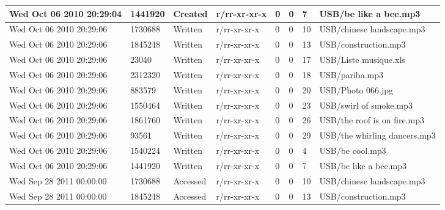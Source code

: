\begin{longtable}[c]{|p{0.121\DUtablewidth}|p{0.1\DUtablewidth}|p{0.08\DUtablewidth}|p{0.12\DUtablewidth}|p{0.06\DUtablewidth}|p{0.06\DUtablewidth}|p{0.06\DUtablewidth}|p{0.2\DUtablewidth}|}
Wed Oct 06 2010 20:29:04
 & 
1441920
 & 
Created
 & 
r/rr-xr-xr-x
 & 
0
 & 
0
 & 
7
 & 
USB/be like a bee.mp3
 \\
\hline

Wed Oct 06 2010 20:29:06
 & 
1730688
 & 
Written
 & 
r/rr-xr-xr-x
 & 
0
 & 
0
 & 
10
 & 
USB/chinese landscape.mp3
 \\
\hline

Wed Oct 06 2010 20:29:06
 & 
1845248
 & 
Written
 & 
r/rr-xr-xr-x
 & 
0
 & 
0
 & 
13
 & 
USB/construction.mp3
 \\
\hline

Wed Oct 06 2010 20:29:06
 & 
23040
 & 
Written
 & 
r/rr-xr-xr-x
 & 
0
 & 
0
 & 
17
 & 
USB/Liste musique.xls
 \\
\hline

Wed Oct 06 2010 20:29:06
 & 
2312320
 & 
Written
 & 
r/rr-xr-xr-x
 & 
0
 & 
0
 & 
18
 & 
USB/pariba.mp3
 \\
\hline

Wed Oct 06 2010 20:29:06
 & 
883579
 & 
Written
 & 
r/rr-xr-xr-x
 & 
0
 & 
0
 & 
20
 & 
USB/Photo 066.jpg
 \\
\hline

Wed Oct 06 2010 20:29:06
 & 
1550464
 & 
Written
 & 
r/rr-xr-xr-x
 & 
0
 & 
0
 & 
23
 & 
USB/swirl of smoke.mp3
 \\
\hline

Wed Oct 06 2010 20:29:06
 & 
1861760
 & 
Written
 & 
r/rr-xr-xr-x
 & 
0
 & 
0
 & 
26
 & 
USB/the roof is on fire.mp3
 \\
\hline

Wed Oct 06 2010 20:29:06
 & 
93561
 & 
Written
 & 
r/rr-xr-xr-x
 & 
0
 & 
0
 & 
29
 & 
USB/the whirling dancers.mp3
 \\
\hline

Wed Oct 06 2010 20:29:06
 & 
1540224
 & 
Written
 & 
r/rr-xr-xr-x
 & 
0
 & 
0
 & 
4
 & 
USB/be cool.mp3
 \\
\hline

Wed Oct 06 2010 20:29:06
 & 
1441920
 & 
Written
 & 
r/rr-xr-xr-x
 & 
0
 & 
0
 & 
7
 & 
USB/be like a bee.mp3
 \\
\hline

Wed Sep 28 2011 00:00:00
 & 
1730688
 & 
Accessed
 & 
r/rr-xr-xr-x
 & 
0
 & 
0
 & 
10
 & 
USB/chinese landscape.mp3
 \\
\hline

Wed Sep 28 2011 00:00:00
 & 
1845248
 & 
Accessed
 & 
r/rr-xr-xr-x
 & 
0
 & 
0
 & 
13
 & 
USB/construction.mp3
 \\
\hline


\end{longtable}

